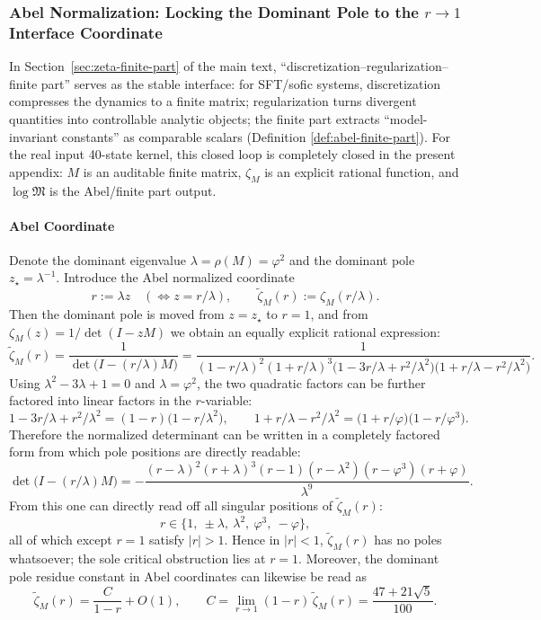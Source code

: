 \subsubsection{Abel Normalization: Locking the Dominant Pole to the $r\to 1$ Interface Coordinate}\label{app:real-input-40-abel}
In Section~\ref{sec:zeta-finite-part} of the main text, ``discretization--regularization--finite part'' serves as the stable interface: for SFT/sofic systems, discretization compresses the dynamics to a finite matrix;
regularization turns divergent quantities into controllable analytic objects; the finite part extracts ``model-invariant constants'' as comparable scalars (Definition \ref{def:abel-finite-part}).
For the real input 40-state kernel, this closed loop is completely closed in the present appendix: $M$ is an auditable finite matrix, $\zeta_M$ is an explicit rational function,
and $\log\mathfrak{M}$ is the Abel/finite part output.

\paragraph{Abel Coordinate}
Denote the dominant eigenvalue $\lambda=\rho(M)=\varphi^2$ and the dominant pole $z_\star=\lambda^{-1}$. Introduce the Abel normalized coordinate
\[
r:=\lambda z\quad(\Leftrightarrow z=r/\lambda),\qquad
\widetilde{\zeta}_M(r):=\zeta_M(r/\lambda).
\]
Then the dominant pole is moved from $z=z_\star$ to $r=1$, and from $\zeta_M(z)=1/\det(I-zM)$ we obtain an equally explicit rational expression:
\[
\widetilde{\zeta}_M(r)
=\frac{1}{\det\!\bigl(I-(r/\lambda)M\bigr)}
=\frac{1}{(1-r/\lambda)^2(1+r/\lambda)^3\bigl(1-3r/\lambda+r^2/\lambda^2\bigr)\bigl(1+r/\lambda-r^2/\lambda^2\bigr)}.
\]
Using $\lambda^2-3\lambda+1=0$ and $\lambda=\varphi^2$, the two quadratic factors can be further factored into linear factors in the $r$-variable:
\[
1-3r/\lambda+r^2/\lambda^2=(1-r)\bigl(1-r/\lambda^2\bigr),\qquad
1+r/\lambda-r^2/\lambda^2=\bigl(1+r/\varphi\bigr)\bigl(1-r/\varphi^3\bigr).
\]
Therefore the normalized determinant can be written in a completely factored form from which pole positions are directly readable:
\[
\det\!\bigl(I-(r/\lambda)M\bigr)
=-\frac{(r-\lambda)^2(r+\lambda)^3(r-1)(r-\lambda^2)(r-\varphi^3)(r+\varphi)}{\lambda^9}.
\]
From this one can directly read off all singular positions of $\widetilde{\zeta}_M(r)$:
\[
r\in\{1,\ \pm\lambda,\ \lambda^2,\ \varphi^3,\ -\varphi\},
\]
all of which except $r=1$ satisfy $|r|>1$. Hence in $|r|<1$, $\widetilde{\zeta}_M(r)$ has no poles whatsoever; the sole critical obstruction lies at $r=1$.
Moreover, the dominant pole residue constant in Abel coordinates can likewise be read as
\[
\widetilde{\zeta}_M(r)=\frac{C}{1-r}+O(1),
\qquad
C=\lim_{r\to 1}(1-r)\,\widetilde{\zeta}_M(r)=\frac{47+21\sqrt5}{100}.
\]
